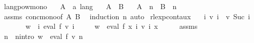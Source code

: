 \begin{isabellebody}
\endisatagproof
{\isafoldproof}%
%
\isadelimproof
%
\endisadelimproof
%
\isadelimdocument
%
\endisadelimdocument
%
\isatagdocument
%
\isamarkuptrue%
%
\endisatagdocument
{\isafolddocument}%
%
\isadelimdocument
%
\endisadelimdocument
{}\isamarkupfalse%
\ langpow{\isacharunderscore}{\kern0pt}mono{\isacharcolon}{\kern0pt}\isanewline
\ \ \ A\ {\isacharcolon}{\kern0pt}{\isacharcolon}{\kern0pt}\ {\isachardoublequoteopen}{\isacharprime}{\kern0pt}a\ lang{\isachardoublequoteclose}\isanewline
\ \ \ {\isachardoublequoteopen}A\ {\isasymsubseteq}\ B{\isachardoublequoteclose}\isanewline
\ \ \ {\isachardoublequoteopen}A\ {\isacharcircum}{\kern0pt}{\isacharcircum}{\kern0pt}\ n\ {\isasymsubseteq}\ B\ {\isacharcircum}{\kern0pt}{\isacharcircum}{\kern0pt}\ n{\isachardoublequoteclose}\isanewline
%
\isadelimproof
%
\endisadelimproof
%
\isatagproof
{}\isamarkupfalse%
\ assms\ conc{\isacharunderscore}{\kern0pt}mono{\isacharbrackleft}{\kern0pt}of\ A\ B{\isacharbrackright}{\kern0pt}\ \isamarkupfalse%
\ {\isacharparenleft}{\kern0pt}induction\ n{\isacharparenright}{\kern0pt}\ auto%
\endisatagproof
{\isafoldproof}%
%
\isadelimproof
\isanewline
%
\endisadelimproof
\isanewline
{}\isamarkupfalse%
\ rlexp{\isacharunderscore}{\kern0pt}cont{\isacharunderscore}{\kern0pt}aux{}{\isacharcolon}{\kern0pt}\isanewline
\ \ \ {\isachardoublequoteopen}{\isasymforall}i{\isachardot}{\kern0pt}\ v\ i\ {\isasymle}\ v\ {\isacharparenleft}{\kern0pt}Suc\ i{\isacharparenright}{\kern0pt}{\isachardoublequoteclose}\isanewline
\ \ \ \ \ \ \ {\isachardoublequoteopen}w\ {\isasymin}\ {\isacharparenleft}{\kern0pt}{\isasymUnion}i{\isachardot}{\kern0pt}\ eval\ f\ {\isacharparenleft}{\kern0pt}v\ i{\isacharparenright}{\kern0pt}{\isacharparenright}{\kern0pt}{\isachardoublequoteclose}\isanewline
\ \ \ \ \ {\isachardoublequoteopen}w\ {\isasymin}\ eval\ f\ {\isacharparenleft}{\kern0pt}{\isasymlambda}x{\isachardot}{\kern0pt}\ {\isasymUnion}i{\isachardot}{\kern0pt}\ v\ i\ x{\isacharparenright}{\kern0pt}{\isachardoublequoteclose}\isanewline
%
\isadelimproof
%
\endisadelimproof
%
\isatagproof
{}\isamarkupfalse%
\ {\isacharminus}{\kern0pt}\isanewline
\ \ \isamarkupfalse%
\ assms{\isacharparenleft}{\kern0pt}{}{\isacharparenright}{\kern0pt}\ \isamarkupfalse%
\ n\ \ n{\isacharunderscore}{\kern0pt}intro{\isacharcolon}{\kern0pt}\ {\isachardoublequoteopen}w\ {\isasymin}\ eval\ f\ {\isacharparenleft}{\kern0pt}v\ n{\isacharparenright}{\kern0pt}{\isachardoublequoteclose}\ \isamarkupfalse%

\end{isabellebody}

